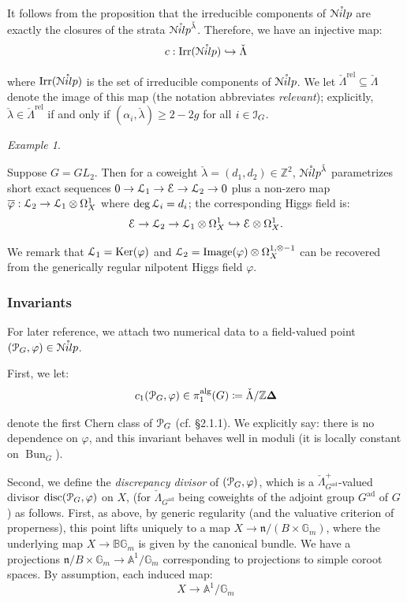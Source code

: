 \documentclass[reqno,11pt]{amsart}
\numberwithin{equation}{subsection}
\theoremstyle{remark}
\newtheorem{example}[thm]{Example}
\newcommand{\into}{\hookrightarrow}
\newcommand{\bDelta}{\mathbf{\Delta}}
\newcommand{\bA}{{\mathbb A}}
\newcommand{\bB}{{\mathbb B}}
\newcommand{\bG}{{\mathbb G}}
\newcommand{\bZ}{{\mathbb Z}}
\newcommand{\sE}{{\EuScript E}}
\newcommand{\sI}{{\EuScript I}}
\newcommand{\sL}{{\EuScript L}}
\newcommand{\sN}{{\EuScript N}}
\newcommand{\sP}{{\EuScript P}}
\newcommand{\fn}{{\mathfrak n}}
\newcommand{\on}{\operatorname}
\newcommand{\ol}[1]{\overline{#1}{}}
\newcommand{\Ker}{\on{Ker}}
\newcommand{\ad}{\on{ad}}
\newcommand{\vph}{\varphi}
\newcommand{\Bun}{\on{Bun}}
\renewcommand{\o}[1]{\mathring{#1}}
\renewcommand{\subset}{\subseteq}
\newcommand{\Nilp}{\sN ilp}
\newcommand{\Irr}{\on{Irr}}
\begin{document}
It follows from the proposition that the irreducible components
of $\o{\Nilp}$ are exactly the closures of the strata
$\o{\Nilp}^{\check{\lambda}}$. Therefore, we have an injective map:
%
\begin{equation}\label{eq:irr-nilp}
c:\Irr(\o{\Nilp}) \into \check{\Lambda}
\end{equation}

\noindent where $\Irr(\o{\Nilp})$ is the set of irreducible components
of $\o{\Nilp}$. We let $\check{\Lambda}^{\on{rel}} \subset \check{\Lambda}$
denote the image of this map (the notation abbreviates \emph{relevant}); 
explicitly, $\check{\lambda} \in \check{\Lambda}^{\on{rel}}$ if
and only if $(\alpha_i,\check{\lambda}) \geq 2-2g$ for all $i \in \sI_G$.

\begin{example}\label{e:nilp-gl2}

Suppose $G = GL_2$. Then for a coweight $\check{\lambda} = (d_1,d_2) \in \bZ^2$, 
$\o{\Nilp}^{\check{\lambda}}$ parametrizes short exact sequences 
$0 \to \sL_1 \to \sE \to \sL_2 \to 0$
plus a non-zero map $\ol{\vph}:\sL_2 \to \sL_1 \otimes \Omega_X^1$ where
$\deg \sL_i = d_i$; the corresponding Higgs field is:
%
\[
\sE \to \sL_2 \to \sL_1 \otimes \Omega_X^1 \into \sE\otimes \Omega_X^1.
\]

\noindent We remark that $\sL_1 = \Ker(\vph)$ and 
$\sL_2  = \on{Image}(\vph) \otimes \Omega_X^{1,\otimes -1}$ can be recovered from the
generically regular nilpotent Higgs field $\vph$.

\end{example}

\subsubsection{Invariants}\label{sss:discrepancy} 

For later reference, we attach two numerical data to a field-valued
point $(\sP_G,\vph) \in \o{\Nilp}$. 

First, we let: 
%
\[
c_1(\sP_G,\vph) \in \pi_1^{\on{alg}}(G) 
\coloneqq \check{\Lambda}/\bZ\bDelta
\]

\noindent denote the first Chern class of $\sP_G$
(cf. \cite{hitchin} \S 2.1.1). We
explicitly say: there is no dependence on $\vph$, and this
invariant behaves well in moduli (it is locally constant on $\Bun_G$).

Second, we define the \emph{discrepancy divisor}
of $(\sP_G,\vph)$, which is a $\check{\Lambda}_{G^{\ad}}^+$-valued divisor 
$\on{disc}(\sP_G,\vph)$ on
$X$, (for $\check{\Lambda}_{G^{\ad}}$ being 
coweights of the adjoint group $G^{\ad}$ of $G$) as follows. 
First, as above, by generic regularity (and the valuative criterion
of properness), this point lifts uniquely to a map 
$X \to \fn/(B \times \bG_m)$, where the underlying
map $X \to \bB \bG_m$ is given by the canonical bundle. 
We have a projections $\fn/B \times \bG_m \to \bA^1/\bG_m$
corresponding to projections to simple coroot spaces.
By assumption, each induced map:
%
\[
X \to \bA^1/\bG_m
\]
\end{document}
